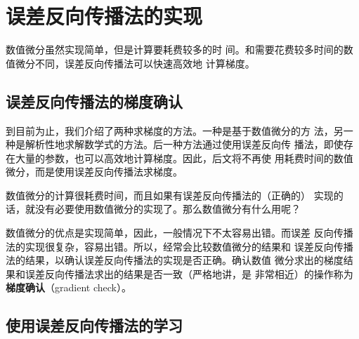 \section{误差反向传播法的实现}
数值微分虽然实现简单，但是计算要耗费较多的时
间。和需要花费较多时间的数值微分不同，误差反向传播法可以快速高效地
计算梯度。

\subsection{误差反向传播法的梯度确认}
到目前为止，我们介绍了两种求梯度的方法。一种是基于数值微分的方
法，另一种是解析性地求解数学式的方法。后一种方法通过使用误差反向传
播法，即使存在大量的参数，也可以高效地计算梯度。因此，后文将不再使
用耗费时间的数值微分，而是使用误差反向传播法求梯度。

数值微分的计算很耗费时间，而且如果有误差反向传播法的（正确的）
实现的话，就没有必要使用数值微分的实现了。那么数值微分有什么用呢？

数值微分的优点是实现简单，因此，一般情况下不太容易出错。而误差
反向传播法的实现很复杂，容易出错。所以，经常会比较数值微分的结果和
误差反向传播法的结果，以确认误差反向传播法的实现是否正确。确认数值
微分求出的梯度结果和误差反向传播法求出的结果是否一致（严格地讲，是
非常相近）的操作称为\textbf{梯度确认}（gradient check）。
\subsection{使用误差反向传播法的学习}